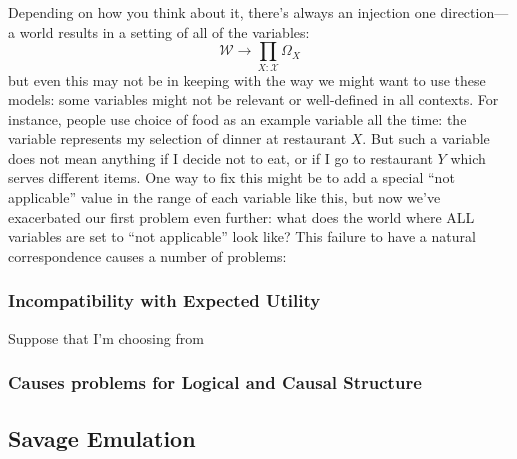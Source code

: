 \documentclass{article}
\theoremstyle{plain}
\theoremstyle{definition}
\theoremstyle{remark}
\begin{document}
	Depending on how you think about it, there's always an injection one direction--- a world results in a setting of all of the variables:
	\[ \mathcal W \to \prod_{X: \mathcal X} \Omega_X \] 
	but even this may not be in keeping with the way we might want to use these models: some variables might not be relevant or well-defined in all contexts. For instance, people use choice of food as an example variable all the time: the variable represents my selection of dinner at restaurant $X$. But such a variable does not mean anything if I decide not to eat, or if I go to restaurant $Y$ which serves different items. One way to fix this might be to add a special ``not applicable'' value in the range of each variable like this, but now we've exacerbated our first problem even further: what does the world where ALL variables are set to ``not applicable'' look like? This failure to have a natural correspondence causes a number of problems:
	
	\subsubsection{Incompatibility with Expected Utility}
	
	Suppose that I'm choosing from 
	
	\subsubsection{Causes problems for Logical and Causal Structure}
	
	\subsection{Savage Emulation}
	
	\printbibliography
	
\end{document}
